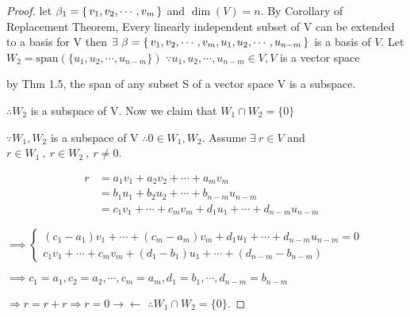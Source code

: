 \begin{proof}
	let $\beta_1 = \left\{ \,v_1,v_2,\cdots,v_m \,\right\}$ and $\dim(V) = n$.
	By Corollary of Replacement Theorem, Every linearly independent subset of V can be extended to a basis for V then
		$\exists~\beta = \left\{ \,v_1,v_2,\cdots,v_m,u_1,u_2,\cdots,u_{n-m} \,\right\}$ is a basis of $V$. Let $W_2 = \text{span$(\{u_1,u_2,\cdots,u_{n-m}\})$}$
		$\because u_1,u_2,\cdots,u_{n-m} \in V,V$ is a vector space 
		
		by Thm 1.5, the span of any subset S of a vector space V is a subspace.
		
		$\therefore W_2$ is a subspace of V. Now we claim that $W_1 \cap W_2 = \{0\}$
		
		$\because W_1,W_2$ is a subspace of V $\therefore 0 \in W_1 , W_2$.
		Assume $\exists~r \in V$ and $ r \in W_1~,~ r \in W_2~,~ r \neq 0$.
		
		$$\begin{flalign*}
			r & =  a_1v_1 + a_2v_2 + \cdots + a_mv_m &\\
			& =  b_1u_1 + b_2u_2 + \cdots + b_{n-m}u_{n-m} &\\
			& =  c_1v_1 + \cdots + c_mv_m + d_1u_1 + \cdots + d_{n-m}u_{n-m}&
		\end{flalign*}$$
		
		$\implies
		\begin{cases}
			(c_1-a_1)v_1+\cdots+(c_m-a_m)v_m+d_1u_1+\cdots+d_{n-m}u_{n-m} = 0 \\
			c_1v_1 + \cdots + c_mv_m+(d_1-b_1)u_1 + \cdots + (d_{n-m}-b_{n-m})		
		\end{cases}$
		
		$\implies c_1 = a_1,c_2=a_2,\cdots,c_m=a_m,d_1=b_1,\cdots,d_{n-m} = b_{n-m}$
		
		$\Rightarrow r = r+r \Rightarrow r=0 \rightarrow\leftarrow $ $\therefore W_1 \cap W_2 = \{0\}$.
\end{proof}
